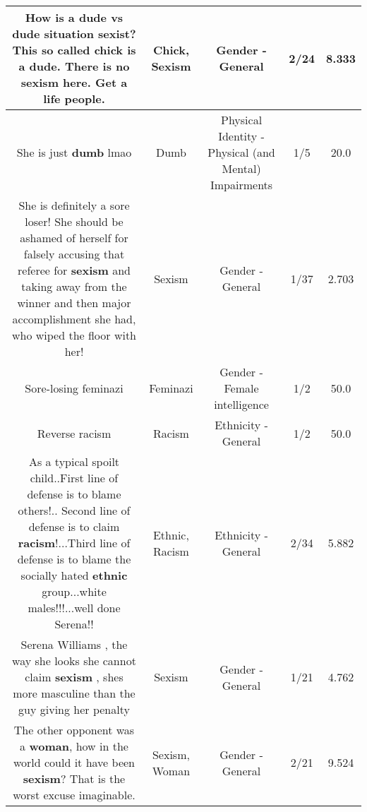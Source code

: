 \documentclass[11pt]{article}
\newlength\mylength
\begin{document}
\begin{center}
\begin{longtable}{|C{.65\mylength}|C{.30\mylength}|C{.12\mylength}|C{.12\mylength}|C{.12\mylength}|}
  \small How is a dude vs dude situation sexist? This so called \textbf{chick} is a dude. There is no \textbf{sexism} here. Get a life people.\normalsize   & Chick, Sexism & Gender - General & 2/24 & 8.333 \\  \hline
  \small She is just \textbf{dumb} lmao\normalsize   & Dumb & Physical Identity - Physical (and Mental) Impairments & 1/5 & 20.0 \\  \hline
  \small She is definitely a sore loser! She should be ashamed of herself for falsely accusing that referee for \textbf{sexism} and taking away from the winner and then  major accomplishment she had, who wiped the floor with her!\normalsize   & Sexism & Gender - General & 1/37 & 2.703 \\  \hline
  \small Sore-losing feminazi\normalsize   & Feminazi & Gender - Female intelligence & 1/2 & 50.0 \\  \hline
  \small Reverse racism\normalsize   & Racism & Ethnicity - General & 1/2 & 50.0 \\  \hline
  \small As a typical spoilt child..First line of defense is to blame others!.. Second line of defense is to claim \textbf{racism}!...Third line of defense is to blame the socially hated \textbf{ethnic} group...white males!!!...well done Serena!!\normalsize   & Ethnic, Racism & Ethnicity - General & 2/34 & 5.882 \\  \hline
  \small Serena Williams , the way she looks she cannot claim \textbf{sexism} , shes more masculine than the guy giving her penalty\normalsize   & Sexism & Gender - General & 1/21 & 4.762 \\  \hline
  \small The other opponent was a \textbf{woman}, how in the world could it have been \textbf{sexism}? That is the worst excuse imaginable.\normalsize   & Sexism, Woman & Gender - General & 2/21 & 9.524 \\  \hline

\end{longtable}
\end{center}
\end{document}
